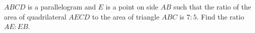 $ABCD$ is a parallelogram and $E$ is a point on side $AB$ such that the ratio of the area of quadrilateral $AECD$ to the area of triangle $ABC$ is $7:5$. Find the ratio $AE:EB$.
